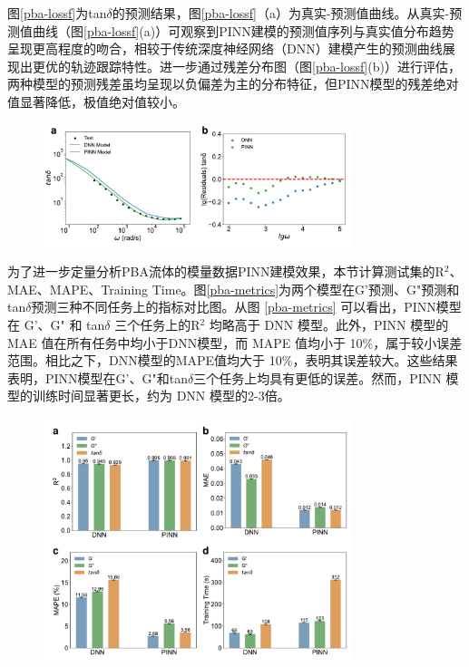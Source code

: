 图\ref{pba-lossf}为tan$\delta$的预测结果，图\ref{pba-lossf}（a）为真实-预测值曲线。从真实-预测值曲线（图\ref{pba-lossf}(a)）可观察到PINN建模的预测值序列与真实值分布趋势呈现更高程度的吻合，相较于传统深度神经网络（DNN）建模产生的预测曲线展现出更优的轨迹跟踪特性。进一步通过残差分布图（图\ref{pba-lossf}(b)）进行评估，两种模型的预测残差虽均呈现以负偏差为主的分布特征，但PINN模型的残差绝对值显著降低，极值绝对值较小。
\begin{figure}[htbp]
  \centering
  \includegraphics[width=0.8\textwidth]{Fig/pba-lossf.pdf}
\end{figure}
为了进一步定量分析PBA流体的模量数据PINN建模效果，本节计算测试集的R$^2$、MAE、MAPE、Training Time。图\ref{pba-metrics}为两个模型在G'预测、G"预测和tan$\delta$预测三种不同任务上的指标对比图。从图 \ref{pba-metrics} 可以看出，PINN模型在 G'、G" 和 tan$\delta$ 三个任务上的R$^2$ 均略高于 DNN 模型。此外，PINN 模型的 MAE 值在所有任务中均小于DNN模型，而 MAPE 值均小于 10\%，属于较小误差范围。相比之下，DNN模型的MAPE值均大于 10\%，表明其误差较大。这些结果表明，PINN模型在G'、G"和tan$\delta$三个任务上均具有更低的误差。然而，PINN 模型的训练时间显著更长，约为 DNN 模型的2-3倍。
\begin{figure}[htbp]
  \centering
  \includegraphics[width=0.8\textwidth]{Fig/pba-metrics.pdf}
\end{figure}
